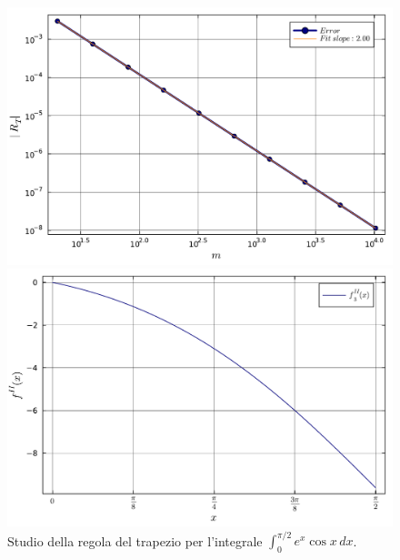 \documentclass[letterpaper, 12pt]{article}
\begin{document}
\begin{figure}[!ht]
    \centering
    \begin{minipage}[b]{0.47\textwidth}
        \includegraphics[width=\textwidth]{5123.pdf}
    \end{minipage}
    \hspace{0.5cm}
    \begin{minipage}[b]{0.47\textwidth}
        \includegraphics[width=\textwidth]{5123_2.pdf}
    \end{minipage}
    \caption{Studio della regola del trapezio per l'integrale $\int_0^{\pi/2}e^x \cos x\, dx$.}
    \label{fig:es5_1_2_3}
\end{figure}
\end{document}
